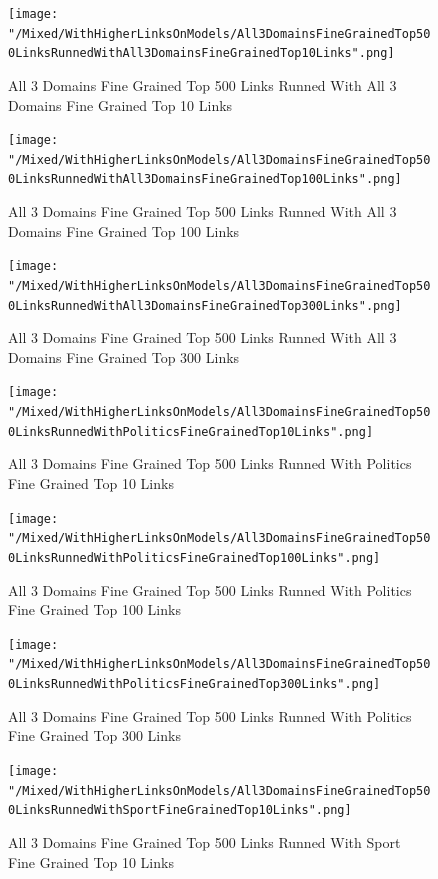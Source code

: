 \documentclass[thesis=M,english]{FITthesis}[2018/05/30]
\begin{document}
	\begin{figure}[H]\centering
		\texttt{[image: "/Mixed/WithHigherLinksOnModels/All3DomainsFineGrainedTop500LinksRunnedWithAll3DomainsFineGrainedTop10Links".png]}
		\caption{All 3 Domains Fine Grained Top 500 Links Runned With All 3 Domains Fine Grained Top 10 Links}\label{}
	\end{figure}	
	
	\begin{figure}[H]\centering
		\texttt{[image: "/Mixed/WithHigherLinksOnModels/All3DomainsFineGrainedTop500LinksRunnedWithAll3DomainsFineGrainedTop100Links".png]}
		\caption{All 3 Domains Fine Grained Top 500 Links Runned With All 3 Domains Fine Grained Top 100 Links}\label{}
	\end{figure}	
	
	\begin{figure}[H]\centering
		\texttt{[image: "/Mixed/WithHigherLinksOnModels/All3DomainsFineGrainedTop500LinksRunnedWithAll3DomainsFineGrainedTop300Links".png]}
		\caption{All 3 Domains Fine Grained Top 500 Links Runned With All 3 Domains Fine Grained Top 300 Links}\label{}
	\end{figure}
	
	\begin{figure}[H]\centering
		\texttt{[image: "/Mixed/WithHigherLinksOnModels/All3DomainsFineGrainedTop500LinksRunnedWithPoliticsFineGrainedTop10Links".png]}
		\caption{All 3 Domains Fine Grained Top 500 Links Runned With Politics Fine Grained Top 10 Links}\label{}
	\end{figure}
	
	\begin{figure}[H]\centering
		\texttt{[image: "/Mixed/WithHigherLinksOnModels/All3DomainsFineGrainedTop500LinksRunnedWithPoliticsFineGrainedTop100Links".png]}
		\caption{All 3 Domains Fine Grained Top 500 Links Runned With Politics Fine Grained Top 100 Links}\label{}
	\end{figure}
	
	\begin{figure}[H]\centering
		\texttt{[image: "/Mixed/WithHigherLinksOnModels/All3DomainsFineGrainedTop500LinksRunnedWithPoliticsFineGrainedTop300Links".png]}
		\caption{All 3 Domains Fine Grained Top 500 Links Runned With Politics Fine Grained Top 300 Links}\label{}
	\end{figure}
	
	\begin{figure}[H]\centering
		\texttt{[image: "/Mixed/WithHigherLinksOnModels/All3DomainsFineGrainedTop500LinksRunnedWithSportFineGrainedTop10Links".png]}
		\caption{All 3 Domains Fine Grained Top 500 Links Runned With Sport Fine Grained Top 10 Links}\label{}
	\end{figure}	
	
\end{document}
